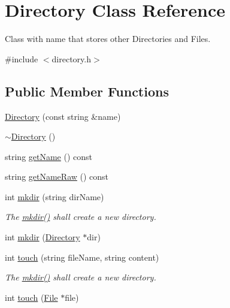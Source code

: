 \hypertarget{class_directory}{}\section{Directory Class Reference}
\label{class_directory}


Class with name that stores other Directories and Files.  




{\ttfamily \#include $<$directory.\+h$>$}

\subsection*{Public Member Functions}
\begin{DoxyCompactItemize}
\item 
\hyperlink{class_directory_a0b019225671a50ead8dbb22b97667676}{Directory} (const string \&name)
\item 
\hyperlink{class_directory_affbde8714685c61601421097d621341d}{$\sim$\+Directory} ()
\item 
string \hyperlink{class_directory_adfb3c1b9b65ca47aaef4c91fb44adf83}{get\+Name} () const
\item 
string \hyperlink{class_directory_ac9641eabb49e810239d66bcc99bb8e98}{get\+Name\+Raw} () const
\item 
int \hyperlink{class_directory_adfec0eb4ee88844c1483363b14543e92}{mkdir} (string dir\+Name)
\begin{DoxyCompactList}\small\item\em The \hyperlink{class_directory_adfec0eb4ee88844c1483363b14543e92}{mkdir()} shall create a new directory. \end{DoxyCompactList}\item 
int \hyperlink{class_directory_a02a77fbbfda041d430ec4d6f78ba8618}{mkdir} (\hyperlink{class_directory}{Directory} $\ast$dir)
\item 
int \hyperlink{class_directory_abe82fee2bf7d59d277133848d8c9833d}{touch} (string file\+Name, string content)
\begin{DoxyCompactList}\small\item\em The \hyperlink{class_directory_adfec0eb4ee88844c1483363b14543e92}{mkdir()} shall create a new directory. \end{DoxyCompactList}\item 
int \hyperlink{class_directory_ab78fbd1a38c3e9f3926372f9fb2ccf5e}{touch} (\hyperlink{class_file}{File} $\ast$file)
\item 

\end{DoxyCompactItemize}
